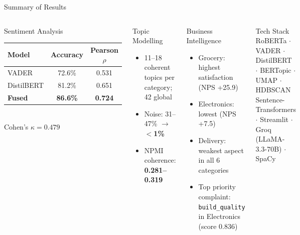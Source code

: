 \documentclass[aspectratio=169,xcolor=dvipsnames,10pt]{beamer}
\begin{document}
\begin{frame}{Summary of Results}
    \begin{columns}[T]
        \begin{block}{Sentiment Analysis}
            \footnotesize
            \begin{tabular}{lcc}
                \toprule
                \textbf{Model} & \textbf{Accuracy} & \textbf{Pearson $\rho$} \\
                \midrule
                VADER          & 72.6\% & 0.531 \\
                DistilBERT     & 81.2\% & 0.651 \\
                \textbf{Fused} & \textbf{86.6\%} & \textbf{0.724} \\
                \bottomrule
            \end{tabular}
            \vspace{0.3em}\\
            Cohen's $\kappa = 0.479$
        \end{block}

        \vspace{0.4em}
        \begin{block}{Topic Modelling}
            \footnotesize
            \begin{itemize}
                \item 11--18 coherent topics per category; 42 global
                \item Noise: 31--47\% $\rightarrow$ \textbf{$<$1\%}
                \item NPMI coherence: \textbf{0.281--0.319}
            \end{itemize}
        \end{block}

        \begin{block}{Business Intelligence}
            \footnotesize
            \begin{itemize}
                \item Grocery: highest satisfaction (NPS +25.9)
                \item Electronics: lowest (NPS +7.5)
                \item Delivery: weakest aspect in all 6 categories
                \item Top priority complaint: \texttt{build\_quality} in Electronics (score 0.836)
            \end{itemize}
        \end{block}

        \vspace{0.4em}
        \begin{exampleblock}{Tech Stack}
            \scriptsize
            RoBERTa $\cdot$ VADER $\cdot$ DistilBERT $\cdot$ BERTopic $\cdot$ UMAP $\cdot$ HDBSCAN\\
            Sentence-Transformers $\cdot$ Streamlit $\cdot$ Groq (LLaMA-3.3-70B) $\cdot$ SpaCy
        \end{exampleblock}
    \end{columns}
\end{frame}
\end{document}
